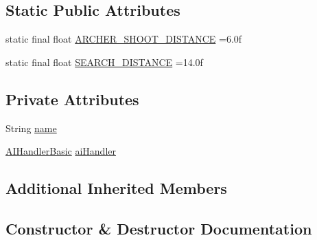 \subsection*{Static Public Attributes}
\begin{DoxyCompactItemize}
\item 
static final float \mbox{\hyperlink{classentities_1_1_archer_ab90fa52ea365366f335cf1a724974c26}{A\+R\+C\+H\+E\+R\+\_\+\+S\+H\+O\+O\+T\+\_\+\+D\+I\+S\+T\+A\+N\+CE}} =6.\+0f
\item 
static final float \mbox{\hyperlink{classentities_1_1_archer_a245f78acfee4f0d62fccd2d9ba3f0fc3}{S\+E\+A\+R\+C\+H\+\_\+\+D\+I\+S\+T\+A\+N\+CE}} =14.\+0f
\end{DoxyCompactItemize}
\subsection*{Private Attributes}
\begin{DoxyCompactItemize}
\item 
String \mbox{\hyperlink{classentities_1_1_archer_a2c5680a0d628e5abbf69711d7df4d0b6}{name}}
\item 
\mbox{\hyperlink{classentities_1_1_a_i_handler_basic}{A\+I\+Handler\+Basic}} \mbox{\hyperlink{classentities_1_1_archer_a362254fb1ca99f07804647033ffe26d1}{ai\+Handler}}
\end{DoxyCompactItemize}
\subsection*{Additional Inherited Members}


\subsection{Constructor \& Destructor Documentation}
\mbox{\label{classentities_1_1_archer_a8f0807d8378f9f336f047ff9407df873}} 
